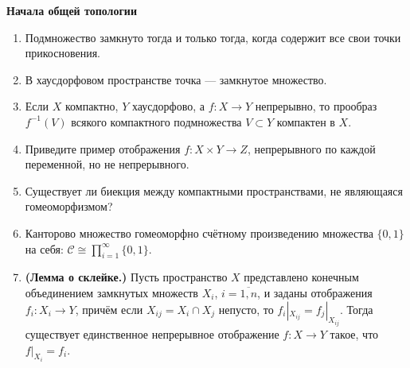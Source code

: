 \documentclass[a4paper]{article}
\begin{document}


\begin{center}
	\large{\textbf{Начала общей топологии}}
\end{center}

\begin{enumerate}
\item Подмножество замкнуто тогда и только тогда, когда содержит все свои точки прикосновения.
\item В хаусдорфовом пространстве точка --- замкнутое множество.
\item Если $X$ компактно, $Y$ хаусдорфово, а $f\colon X\to Y$ непрерывно, то прообраз $f^{-1}(V)$ всякого компактного подмножества $V\subset Y$ компактен в $X$.
\item Приведите пример отображения $f\colon X\times Y\to Z$, непрерывного по каждой переменной, но не непрерывного.
\item Существует ли биекция между компактными пространствами, не являющаяся гомеоморфизмом?
\item Канторово множество гомеоморфно счётному произведению множества $\{0,1\}$ на себя: $\mathcal{C}\cong\displaystyle\prod\limits_{i=1}^{\infty} \{0,1\}$.
\item \textbf{(Лемма о склейке.)} Пусть пространство $X$ представлено конечным объединением замкнутых множеств $X_i$, $i=\overline{1,n}$, и заданы отображения $f_i\colon X_i\to Y$, причём если $X_{ij}=X_i\cap X_j$ непусто, то $f_i|_{X_{ij}}=f_j|_{X_{ij}}$. Тогда существует единственное непрерывное отображение $f\colon X\to Y$ такое, что $f|_{X_i}=f_i$.

\end{enumerate}
\end{document}
